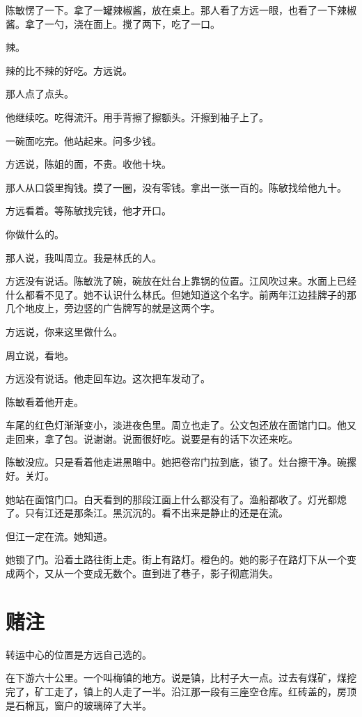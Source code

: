 \documentclass[UTF8,a5paper,11pt,openany]{ctexbook}
\begin{document}
陈敏愣了一下。拿了一罐辣椒酱，放在桌上。那人看了方远一眼，也看了一下辣椒酱。拿了一勺，浇在面上。搅了两下，吃了一口。

辣。

辣的比不辣的好吃。方远说。

那人点了点头。

他继续吃。吃得流汗。用手背擦了擦额头。汗擦到袖子上了。

一碗面吃完。他站起来。问多少钱。

方远说，陈姐的面，不贵。收他十块。

那人从口袋里掏钱。摸了一圈，没有零钱。拿出一张一百的。陈敏找给他九十。

方远看着。等陈敏找完钱，他才开口。

你做什么的。

那人说，我叫周立。我是林氏的人。

方远没有说话。陈敏洗了碗，碗放在灶台上靠锅的位置。江风吹过来。水面上已经什么都看不见了。她不认识什么林氏。但她知道这个名字。前两年江边挂牌子的那几个地皮上，旁边竖的广告牌写的就是这两个字。

方远说，你来这里做什么。

周立说，看地。

方远没有说话。他走回车边。这次把车发动了。

陈敏看着他开走。

车尾的红色灯渐渐变小，淡进夜色里。周立也走了。公文包还放在面馆门口。他又走回来，拿了包。说谢谢。说面很好吃。说要是有的话下次还来吃。

陈敏没应。只是看着他走进黑暗中。她把卷帘门拉到底，锁了。灶台擦干净。碗摞好。关灯。

她站在面馆门口。白天看到的那段江面上什么都没有了。渔船都收了。灯光都熄了。只有江还是那条江。黑沉沉的。看不出来是静止的还是在流。

但江一定在流。她知道。

她锁了门。沿着土路往街上走。街上有路灯。橙色的。她的影子在路灯下从一个变成两个，又从一个变成无数个。直到进了巷子，影子彻底消失。

\clearpage

\chapter{赌注}
\indent
转运中心的位置是方远自己选的。

在下游六十公里。一个叫梅镇的地方。说是镇，比村子大一点。过去有煤矿，煤挖完了，矿工走了，镇上的人走了一半。沿江那一段有三座空仓库。红砖盖的，房顶是石棉瓦，窗户的玻璃碎了大半。
\end{document}

